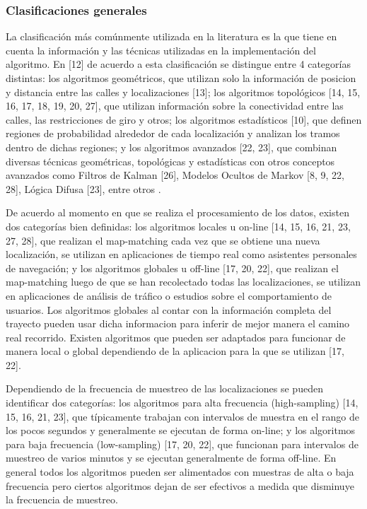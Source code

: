 \documentclass[final,fmstyle]{fpunathesis}
\begin{document}
\subsubsection{Clasificaciones generales}

La clasificación más comúnmente utilizada en la literatura es la que tiene en cuenta la información y las técnicas utilizadas en la implementación del algoritmo. En [12] de acuerdo a esta clasificación se distingue entre 4 categorías distintas: los algoritmos geométricos, que utilizan solo la información de posicion y distancia entre las calles y localizaciones [13]; los algoritmos topológicos [14, 15, 16, 17, 18, 19, 20, 27], que utilizan información sobre la conectividad entre las calles, las restricciones de giro y otros; los algoritmos estadísticos [10], que definen regiones de probabilidad alrededor de cada localización y analizan los tramos dentro de dichas regiones; y los algoritmos avanzados [22, 23], que combinan diversas técnicas geométricas, topológicas y estadísticas con otros conceptos avanzados como Filtros de Kalman [26], Modelos Ocultos de Markov [8, 9, 22, 28], Lógica Difusa [23], entre otros .

De acuerdo al momento en que se realiza el procesamiento de los datos, existen dos categorías bien definidas: los algoritmos locales u on-line [14, 15, 16, 21, 23, 27, 28], que realizan el map-matching cada vez que se obtiene una nueva localización, se utilizan en aplicaciones de tiempo real como asistentes personales de navegación; y los algoritmos globales u off-line [17, 20, 22], que realizan el map-matching luego de que se han recolectado todas las localizaciones, se utilizan en aplicaciones de análisis de tráfico o estudios sobre el comportamiento de usuarios. Los algoritmos globales al contar con la información completa del trayecto pueden usar dicha informacion para inferir de mejor manera el camino real recorrido. Existen algoritmos que pueden ser adaptados para funcionar de manera local o global dependiendo de la aplicacion para la que se utilizan [17, 22].

Dependiendo de la frecuencia de muestreo de las localizaciones se pueden identificar dos categorías: los algoritmos para alta frecuencia (high-sampling) [14, 15, 16, 21, 23], que típicamente trabajan con intervalos de muestra en el rango de los pocos segundos y generalmente se ejecutan de forma on-line; y los algoritmos para baja frecuencia (low-sampling) [17, 20, 22],  que funcionan para intervalos de muestreo de varios minutos y se ejecutan generalmente de forma off-line. En general todos los algoritmos pueden ser alimentados con muestras de alta o baja frecuencia pero ciertos algoritmos dejan de ser efectivos a medida que disminuye la frecuencia de muestreo.
\end{document}
